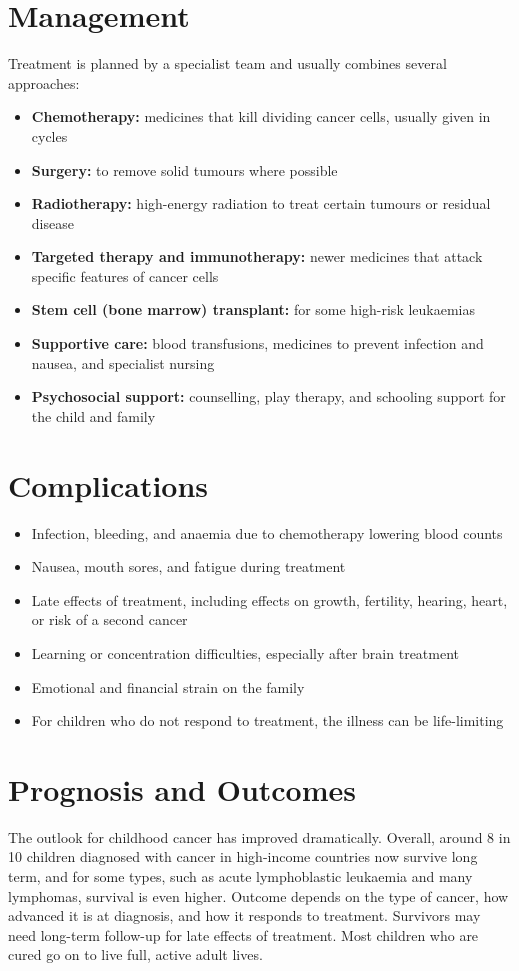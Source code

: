 \section*{Management}
Treatment is planned by a specialist team and usually combines several approaches:

\begin{itemize}
    \item \textbf{Chemotherapy:} medicines that kill dividing cancer cells, usually given in cycles
    \item \textbf{Surgery:} to remove solid tumours where possible
    \item \textbf{Radiotherapy:} high-energy radiation to treat certain tumours or residual disease
    \item \textbf{Targeted therapy and immunotherapy:} newer medicines that attack specific features of cancer cells
    \item \textbf{Stem cell (bone marrow) transplant:} for some high-risk leukaemias
    \item \textbf{Supportive care:} blood transfusions, medicines to prevent infection and nausea, and specialist nursing
    \item \textbf{Psychosocial support:} counselling, play therapy, and schooling support for the child and family
\end{itemize}

\section*{Complications}
\begin{itemize}
    \item Infection, bleeding, and anaemia due to chemotherapy lowering blood counts
    \item Nausea, mouth sores, and fatigue during treatment
    \item Late effects of treatment, including effects on growth, fertility, hearing, heart, or risk of a second cancer
    \item Learning or concentration difficulties, especially after brain treatment
    \item Emotional and financial strain on the family
    \item For children who do not respond to treatment, the illness can be life-limiting
\end{itemize}

\section*{Prognosis and Outcomes}
The outlook for childhood cancer has improved dramatically. Overall, around 8 in 10 children diagnosed with cancer in high-income countries now survive long term, and for some types, such as acute lymphoblastic leukaemia and many lymphomas, survival is even higher. Outcome depends on the type of cancer, how advanced it is at diagnosis, and how it responds to treatment. Survivors may need long-term follow-up for late effects of treatment. Most children who are cured go on to live full, active adult lives.

